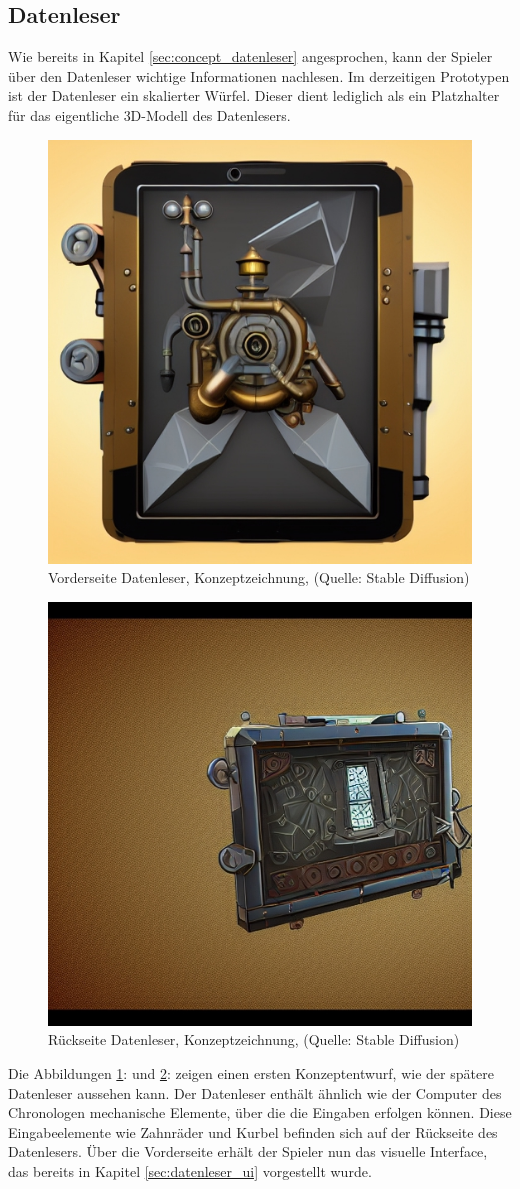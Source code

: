 \subsection{Datenleser}
Wie bereits in Kapitel \ref{sec:concept_datenleser}  angesprochen, kann der Spieler über den Datenleser wichtige Informationen nachlesen. 
Im derzeitigen Prototypen ist der Datenleser ein skalierter Würfel. Dieser dient lediglich als ein Platzhalter für das eigentliche \ac{3D}-Modell des Datenlesers.

\begin{figure}[ht]
\centering
\includegraphics[width=.5\linewidth]{content/pictures/Datenleser_vorderseite.jpg}
\caption{Vorderseite Datenleser, Konzeptzeichnung, (Quelle: Stable Diffusion)}
\label{fig:datenleser_front}
\end{figure}

\begin{figure}[ht]
\centering
\includegraphics[width=.5\linewidth]{content/pictures/Datenleser_rueckseite.jpg}
\caption{Rückseite Datenleser, Konzeptzeichnung, (Quelle: Stable Diffusion)}
\label{fig:datenleser_back}
\end{figure}

Die Abbildungen \ref{fig:datenleser_front}:  und \ref{fig:datenleser_back}:  zeigen einen ersten Konzeptentwurf, wie der spätere Datenleser aussehen kann.
Der Datenleser enthält ähnlich wie der Computer des Chronologen mechanische Elemente, über die die Eingaben erfolgen können. Diese Eingabeelemente wie Zahnräder und Kurbel befinden sich auf der Rückseite des Datenlesers. Über die Vorderseite erhält der Spieler nun das visuelle Interface, das bereits in Kapitel \ref{sec:datenleser_ui}  vorgestellt wurde.

